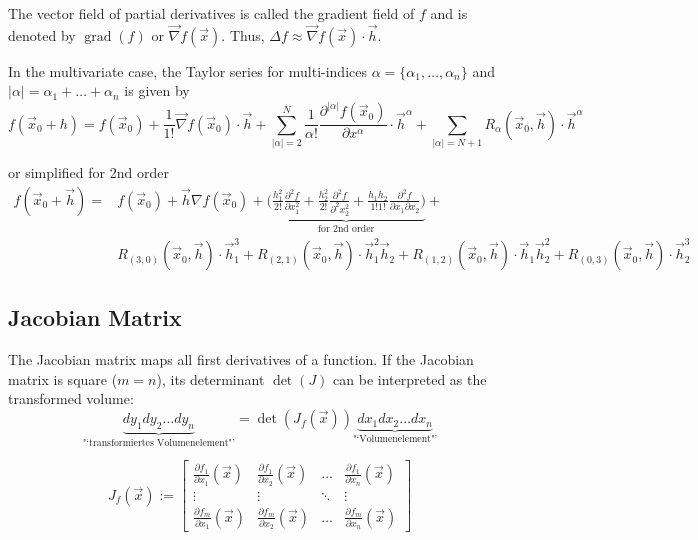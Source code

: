 The vector field of partial derivatives is called the gradient field of $f$ and is denoted by $\operatorname{grad}(f)$ or $\vec{\nabla} f(\vec{x})$.
Thus, $\Delta f \approx \vec{\nabla} f(\vec{x}) \cdot \vec{h}$.

In the multivariate case, the Taylor series for multi-indices $\alpha = \{ \alpha_1, \hdots , \alpha_n \}$ and $|\alpha| = \alpha_1 + \hdots + \alpha_n $ is given by
\[
    f(\vec{x}_0+h) = f(\vec{x}_0) + \frac{1}{1!}\vec{\nabla}f(\vec{x}_0) \cdot \vec{h}
    + \sum\limits_{|\alpha|=2}^N \frac{1}{\alpha!}\frac{\partial^{|\alpha|} f(\vec{x}_0)}{\partial x^{\alpha}} \cdot \vec{h}^{\alpha}
    + \sum\limits_{|\alpha|=N+1} R_{\alpha}(\vec{x}_0,\vec{h}) \cdot \vec{h}^{\alpha}
\]

or simplified for 2nd order
\[
    \begin{split}
        f(\vec{x}_0 + \vec{h}) = & f(\vec{x}_0) + \vec{h} \nabla f(\vec{x}_0) +
        \underbrace{\bigg( \frac{h_1^2}{2!} \frac{\partial^2 f}{\partial x_1^2} + \frac{h_2^2}{2!} \frac{\partial^2 f}{\partial^2 x_2^2}
        + \frac{h_1 h_2}{1!1!} \frac{\partial^2 f}{\partial x_1 \partial x_2}\bigg)}_{\text{for 2nd order}} + \\
        & R_{(3,0)}(\vec{x}_0, \vec{h}) \cdot \vec{h}_1^3 + R_{(2,1)}(\vec{x}_0, \vec{h}) \cdot \vec{h}_1^2 \vec{h}_2 + R_{(1,2)}(\vec{x}_0, \vec{h}) \cdot \vec{h}_1 \vec{h}_2^2 + R_{(0,3)}(\vec{x}_0, \vec{h}) \cdot \vec{h}_2^3
    \end{split}
\]

\subsection{Jacobian Matrix}
\begin{minipage}{12cm}
    The Jacobian matrix maps all first derivatives of a function.
    If the Jacobian matrix is square ($m=n$), its determinant $\det(J)$ can be interpreted as the transformed volume:
    \[
        \underbrace{dy_1 dy_2 \ldots dy_n}_{\text{"`transformiertes Volumenelement"'}} =
        \det(J_f(\vec{x})) \underbrace{dx_1 dx_2 \ldots dx_n}_{\text{"`Volumenelement"'}}
    \]
\end{minipage}
\begin{minipage}{6cm}
    \[
        J_f(\vec{x}) :=  \begin{bmatrix}
        \frac{\partial f_1}{\partial x_1}(\vec{x}) & \frac{\partial f_1}{\partial x_2}(\vec{x}) & \ldots & \frac{\partial f_1}{\partial x_n}(\vec{x}) \\
        \vdots & \vdots & \ddots & \vdots \\
        \frac{\partial f_m}{\partial x_1}(\vec{x}) & \frac{\partial f_m}{\partial x_2}(\vec{x}) & \ldots & \frac{\partial f_m}{\partial x_n} (\vec{x})
        \end{bmatrix}
    \]
\end{minipage} \\

